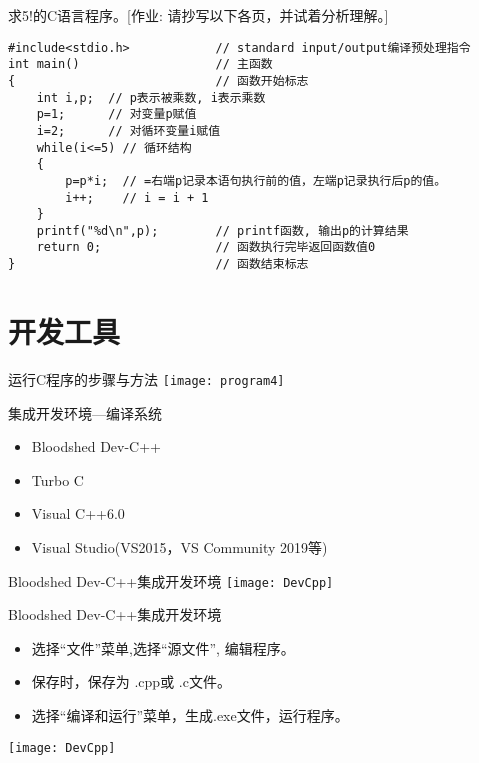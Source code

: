 \begin{frame}[fragile]{求5!的C语言程序。\small{[作业: 请抄写以下各页，并试着分析理解。]}}
\begin{lstlisting}
#include<stdio.h>            // standard input/output编译预处理指令
int main()                   // 主函数
{                            // 函数开始标志
	int i,p;  // p表示被乘数, i表示乘数
	p=1;	  // 对变量p赋值
	i=2;      // 对循环变量i赋值
	while(i<=5) // 循环结构
	{  
		p=p*i;  // =右端p记录本语句执行前的值，左端p记录执行后p的值。
		i++;    // i = i + 1
	}
	printf("%d\n",p);        // printf函数, 输出p的计算结果
	return 0;                // 函数执行完毕返回函数值0
}                            // 函数结束标志
\end{lstlisting}
\end{frame}

\section{开发工具}

\begin{frame}{运行C程序的步骤与方法}
\centering
\texttt{[image: program4]}
\end{frame}

\begin{frame}{集成开发环境---编译系统}
\begin{itemize}
\setlength{\itemsep}{.5cm}
\item Bloodshed Dev-C++ 
\item Turbo C
\item Visual C++6.0 
\item Visual Studio(VS2015，VS Community 2019等)
\end{itemize}
\end{frame}

\begin{frame}{Bloodshed Dev-C++集成开发环境}
\texttt{[image: DevCpp]}   
\end{frame}

\begin{frame}{Bloodshed Dev-C++集成开发环境}
\vspace{-0.3cm}
\begin{itemize}
\item 选择“文件”菜单,选择“源文件”, 编辑程序。
\item 保存时，保存为 .cpp或 .c文件。
\item 选择“编译和运行”菜单，生成.exe文件，运行程序。  
\end{itemize}
\centering 
\texttt{[image: DevCpp]}   
\end{frame}
